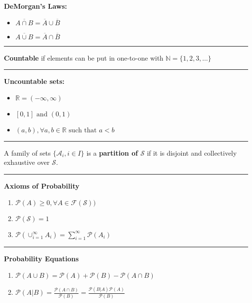 \documentclass{article}
\renewcommand{\S}{\mathcal{S}}
\renewcommand{\P}{\mathcal{P}}
\providecommand{\A}{\mathcal{A}}
\providecommand{\F}{\mathcal{F}}
\providecommand{\N}{\mathbb{N}}
\providecommand{\R}{\mathbb{R}}
\begin{document}
    \raggedright
    \small
    \setlength{\columnseprule}{0.4pt}

    \begin{multicols*}{3}

        \textbf{DeMorgan's Laws:}\\
        \begin{itemize}
            \item $\overline{A\cap B} = \overline{A} \cup \overline{B}$\\
            \item $\overline{A\cup B} = \overline{A} \cap \overline{B}$
        \end{itemize}

        \noindent\rule{\columnwidth}{0.4pt}

        \textbf{Countable} if elements can be put in one-to-one with $\N = \{1,2,3,\dots\}$

        \noindent\rule{\columnwidth}{0.4pt}

        \textbf{Uncountable sets:}
        \begin{itemize}
            \item $\R = (-\infty, \infty)$
            \item $[0, 1] \text{ and } (0,1)$
            \item $(a,b), \forall a,b\in \R \text{ such that } a<b$
        \end{itemize}

        \noindent\rule{\columnwidth}{0.4pt}

        A family of sets $\{\A_i,i\in I\}$ is a \textbf{partition of $\S$} if it is disjoint and collectively exhaustive over $\S$.

        \noindent\rule{\columnwidth}{0.4pt}

        \textbf{Axioms of Probability}
        \begin{enumerate}
            \item $\P(A)\geq0,\allowbreak\forall A\in\F(\S))$
            \item $\P(\S)=1$
            \item $\P(\cup_{i=1}^{\infty} A_i) = \sum_{i=1}^{\infty} \P( A_i)$
        \end{enumerate}

        \noindent\rule{\columnwidth}{0.4pt}

        \textbf{Probability Equations}
        \begin{enumerate}
            \item $\P(A\cup B) = \P(A)+\P(B)-\P(A\cap B)$
            \item $\P(A|B)=\frac{\P(A\cap B)}{\P(B)}=\frac{\P(B|A)\P(A)}{\P(B)}$
        \end{enumerate}


\end{multicols*}
\end{document}
